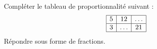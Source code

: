 
\begin{exercice}\label{exo2smath-0011}

    Compléter le tableau de proportionnalité suivant :
    \begin{equation*}
        \begin{array}[]{|c|c|c|}
            \hline
            5&12&\ldots\\
            \hline
            3&\ldots&21\\
            \hline
        \end{array}
    \end{equation*}
    Répondre sous forme de fractions.

\end{exercice}
